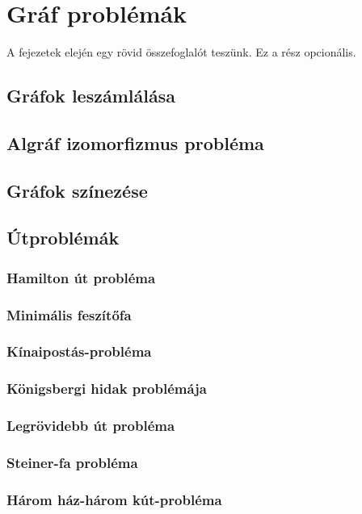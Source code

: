 \chapter{Gráf problémák}\label{ch:ALAP}

\begin{osszefoglal}
	A fejezetek elején egy rövid összefoglalót teszünk. Ez a rész opcionális.
	
\end{osszefoglal}

\section{Gráfok leszámlálása}\label{sec:ALAP:adatelem}

\section{Algráf izomorfizmus probléma}\label{sec:ALAP:adatelem}


\section{Gráfok színezése}\label{sec:ALAP:adatelem}


\section{Útproblémák}\label{sec:ALAP:adatelem}

\subsection{Hamilton út probléma}

\subsection{Minimális feszítőfa}

\subsection{Kínaipostás-probléma}

\subsection{Königsbergi hidak problémája}

\subsection{Legrövidebb út probléma}

\subsection{Steiner-fa probléma}

\subsection{Három ház-három kút-probléma}

